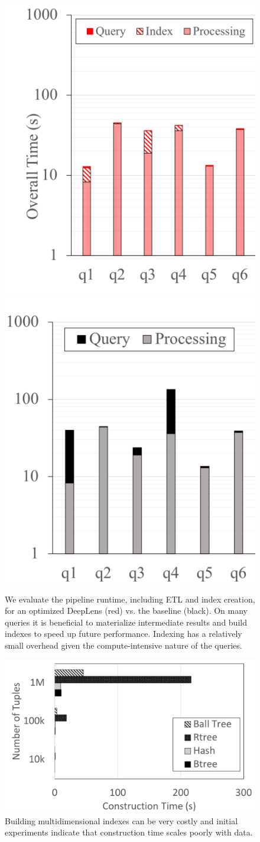 \begin{figure}[t]
\centering
 \includegraphics[width=0.46\columnwidth]{figures/indexing_b.png}
 \includegraphics[width=0.49\columnwidth]{figures/indexing_a.png}
 \caption{We evaluate the pipeline runtime, including ETL and index creation, for an optimized \textsf{DeepLens} (red) vs. the baseline (black). On many queries it is beneficial to materialize intermediate results and build indexes to speed up future performance. Indexing has a relatively small overhead given the compute-intensive nature of the queries. \label{index} }
\end{figure}

\begin{figure}[t]
\centering
 \includegraphics[width=0.8\columnwidth]{figures/indexing.png}
 \caption{Building multidimensional indexes can be very costly and initial experiments indicate that construction time scales poorly with data. \label{indexbuild} }
\end{figure}

